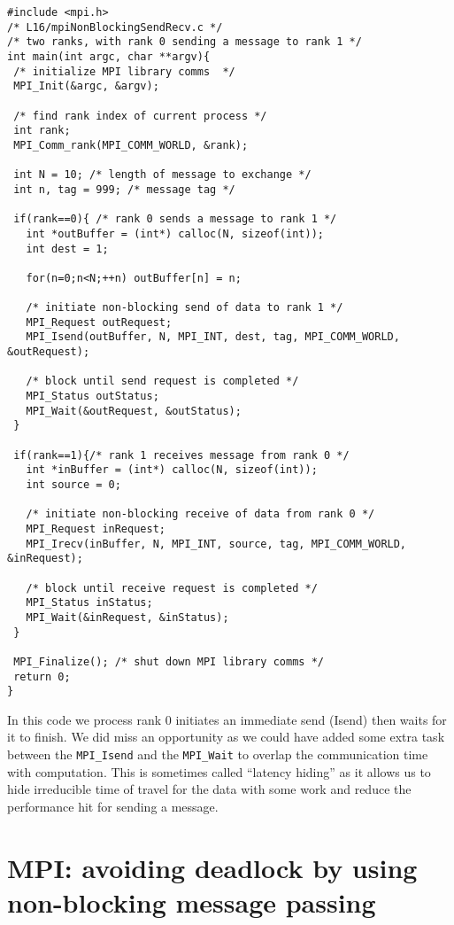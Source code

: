 \begin{verbatim}
#include <mpi.h>
/* L16/mpiNonBlockingSendRecv.c */
/* two ranks, with rank 0 sending a message to rank 1 */
int main(int argc, char **argv){
 /* initialize MPI library comms  */
 MPI_Init(&argc, &argv);
 
 /* find rank index of current process */
 int rank;
 MPI_Comm_rank(MPI_COMM_WORLD, &rank);

 int N = 10; /* length of message to exchange */
 int n, tag = 999; /* message tag */
   
 if(rank==0){ /* rank 0 sends a message to rank 1 */
   int *outBuffer = (int*) calloc(N, sizeof(int));
   int dest = 1;
   
   for(n=0;n<N;++n) outBuffer[n] = n; 
   
   /* initiate non-blocking send of data to rank 1 */
   MPI_Request outRequest;
   MPI_Isend(outBuffer, N, MPI_INT, dest, tag, MPI_COMM_WORLD, &outRequest);
   
   /* block until send request is completed */
   MPI_Status outStatus;
   MPI_Wait(&outRequest, &outStatus);
 }
 
 if(rank==1){/* rank 1 receives message from rank 0 */
   int *inBuffer = (int*) calloc(N, sizeof(int));
   int source = 0;
   
   /* initiate non-blocking receive of data from rank 0 */
   MPI_Request inRequest;
   MPI_Irecv(inBuffer, N, MPI_INT, source, tag, MPI_COMM_WORLD, &inRequest);
   
   /* block until receive request is completed */
   MPI_Status inStatus;
   MPI_Wait(&inRequest, &inStatus);
 }
 
 MPI_Finalize(); /* shut down MPI library comms */
 return 0;
}
\end{verbatim} 

In this code we process rank 0 initiates an immediate send (Isend) then waits for it to finish. We did miss an opportunity as we could have added some extra task between the \texttt{MPI\_Isend} and the \texttt{MPI\_Wait} to overlap the communication time with computation. This is sometimes called ``latency hiding'' as it allows us to hide irreducible time of travel for the data with some work and reduce the performance hit for sending a message.

\section{MPI: avoiding deadlock by using non-blocking message passing}

